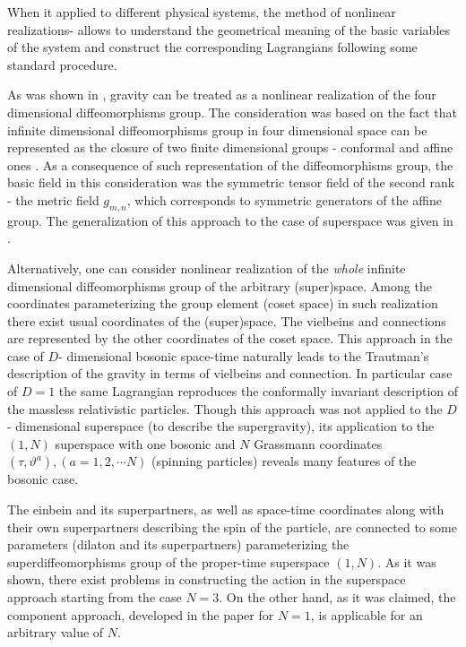 \documentclass[a4paper,twocolumn,showpacs,preprintnumbers,amsmath,amssymb]{revtex4}
\begin{document}
When it applied to different physical systems,
the method of nonlinear realizations\cite{CWZ}-\cite{V}  allows to understand
the geometrical meaning of the basic variables of the system
and construct the corresponding Lagrangians following some standard
procedure.

As was shown in \cite{BO}, gravity can be treated as a nonlinear
realization of the four dimensional diffeomorphisms group.
The consideration was based on the fact that infinite dimensional
diffeomorphisms group in four dimensional space can be represented as the
closure of two finite dimensional groups - conformal and affine ones \cite{OP}.
As a consequence of such representation of the diffeomorphisms group,
the basic field in this consideration was the symmetric tensor
field of the second rank - the metric field $g_{m,n}$, which
corresponds to symmetric generators of the affine group.
The generalization of this approach to the case of superspace was
given in \cite{IN}.

Alternatively, one can consider nonlinear realization of the {\it whole}
infinite dimensional diffeomorphisms group of the arbitrary
(super)space. Among the coordinates parameterizing the group element
(coset space)
in such realization there exist
usual coordinates of the (super)space.
The vielbeins and connections are  represented
by the other coordinates of the coset space. This approach
 in the case of $D$- dimensional bosonic space-time naturally leads to
 the Trautman's\cite{T} description of the gravity in terms of vielbeins
 and connection\cite{P_0}.
 In particular case of $D=1$ the same Lagrangian reproduces the
 conformally invariant description of the
massless relativistic particles\cite{PK}.
Though this approach was not applied to the $D$- dimensional
 superspace (to describe the supergravity),
its application to the $(1,N)$ superspace with one bosonic and
$N$ Grassmann coordinates $(\tau,\vartheta^a), (a=1,2,  \cdots N)$
 (spinning particles)
reveals many features of the bosonic case.

The einbein and its superpartners, as well as space-time
coordinates along with their own superpartners
describing the spin of the particle,
are connected to some parameters (dilaton and its superpartners)
parameterizing the superdiffeomorphisms group of the proper-time
superspace $(1,N)$. As it was shown\cite{P2}, there exist problems in
constructing the action in the superspace approach starting from
the case $N=3$. On the other hand, as it was claimed,
the component approach, developed in the paper\cite{P2} for $N=1$,
is applicable for an arbitrary value of $N$.
\end{document}
